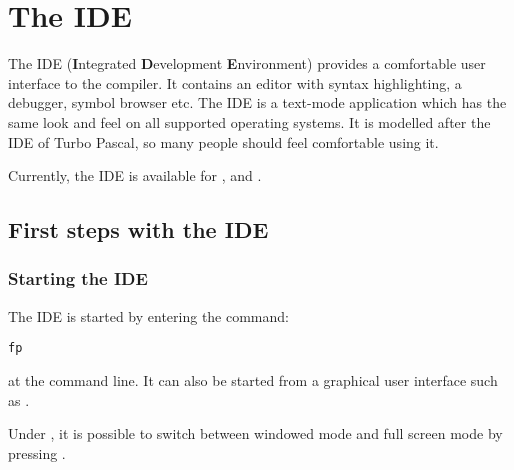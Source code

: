 %
%
%
%
%
\chapter{The IDE}

The IDE (\textbf{I}ntegrated \textbf{D}evelopment \textbf{E}nvironment)
provides a comfortable user interface to the compiler. It contains an
editor with syntax highlighting, a debugger, symbol browser etc.
The IDE is a text-mode application which has the same look and feel
on all supported operating systems. It is modelled after the IDE of Turbo
Pascal, so many people should feel comfortable using it.

Currently, the IDE is available for \dos, \windows and \linux.

\section{First steps with the IDE}
%
%
\subsection{Starting the IDE}
The IDE is started by entering the command:
\begin{verbatim}
fp
\end{verbatim}
at the command line. It can also be started from a graphical user
interface such as \windows.
\begin{remark}
Under \windows, it is possible to switch between windowed mode and
full screen mode by pressing .
\end{remark}
%
%
